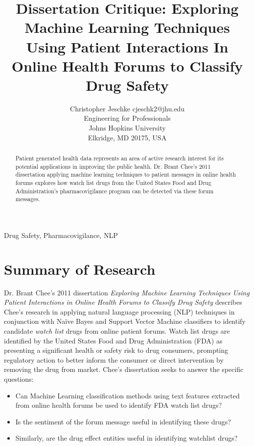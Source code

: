 \documentclass[twoside,11pt]{article}
\begin{document}
\title{Dissertation Critique: Exploring Machine Learning Techniques Using Patient
      Interactions In Online Health Forums to Classify Drug Safety}

\author{\name Christopher Jeschke \email cjeschk2@jhu.edu \\
       \addr Engineering for Professionals\\
       Johns Hopkins University\\
       Elkridge, MD 20175, USA}


\maketitle


\singlespacing

\begin{abstract}%
  Patient generated health data represents an area of active research interest
  for its potential applications in improving the public health. Dr. Brant Chee's 2011 dissertation applying machine learning techniques to patient messages in online health forums explores how watch list drugs from the United States Food and Drug Administration's pharmacovigilance program can be detected via these forum messages.
\end{abstract}

\begin{keywords}
  Drug Safety, Pharmacovigilance, NLP
\end{keywords}

\section{Summary of Research}
Dr. Brant Chee's 2011 dissertation \textit{Exploring Machine Learning Techniques Using
Patient Interactions in Online Health Forums to Classify Drug Safety} describes
Chee's research in applying natural language processing (NLP) techniques in conjunction with Na\"ive Bayes and Support Vector Machine classifiers to identify candidate \textit{watch list} drugs from online patient forums. Watch list drugs are identified by the United States Food and Drug Administration (FDA) as presenting a significant health or safety risk to drug consumers, prompting regulatory action to better inform the consumer or direct intervention by removing the drug from market. Chee's dissertation seeks to answer the specific questions:
\begin{itemize}
  \item Can Machine Learning classification methods using text features extracted from online health forums be used to identify FDA watch list drugs?
  \item Is the sentiment of the forum message useful in identifying these drugs?
  \item Similarly, are the drug effect entities useful in identifying watchlist drugs?
\end{itemize}
\end{document}
